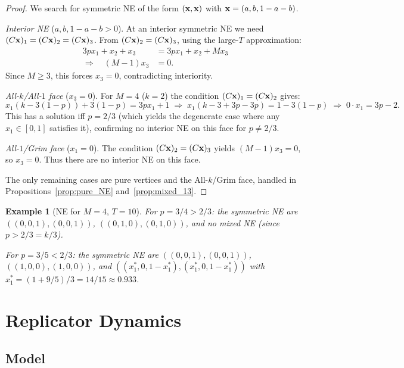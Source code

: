 \documentclass[12pt,a4paper]{article}
\newtheorem{example}{Example}[section]
\begin{document}
\begin{proof}
We search for symmetric NE of the form $({\bf x},{\bf x})$ with
${\bf x}=(a,b,1-a-b)$.

\medskip
\noindent\textit{Interior NE} ($a,b,1-a-b>0$). At an interior symmetric NE
we need $(C{\bf x})_1=(C{\bf x})_2=(C{\bf x})_3$. From $(C{\bf x})_2=(C{\bf x})_3$,
using the large-$T$ approximation:
\begin{align*}
  3px_1+x_2+x_3 &= 3px_1+x_2+Mx_3 \\
  \Rightarrow\quad (M-1)x_3 &= 0.
\end{align*}
Since $M\geq 3$, this forces $x_3=0$, contradicting interiority.

\medskip
\noindent\textit{All-$k$/All-$1$ face} ($x_3=0$). For $M=4$ ($k=2$) the
condition $(C{\bf x})_1=(C{\bf x})_2$ gives:
\[
  x_1(k-3(1-p)) + 3(1-p) = 3px_1 + 1
  \;\Rightarrow\;
  x_1(k-3+3p-3p) = 1-3(1-p)
  \;\Rightarrow\;
  0\cdot x_1 = 3p-2.
\]
This has a solution iff $p=2/3$ (which yields the degenerate case where any
$x_1\in[0,1]$ satisfies it), confirming no interior NE on this face for
$p\neq 2/3$.

\medskip
\noindent\textit{All-$1$/Grim face} ($x_1=0$). The condition $(C{\bf x})_2=(C{\bf x})_3$ yields $(M-1)x_3=0$, so $x_3=0$.
Thus there are no interior NE on this face.

\medskip
The only remaining cases are pure vertices and the All-$k$/Grim face, handled in
Propositions~\ref{prop:pure_NE} and~\ref{prop:mixed_13}.
\end{proof}

\begin{example}[NE for $M=4$, $T=10$]
\label{ex:NE}
For $p=3/4>2/3$: the symmetric NE are
$((0,0,1),(0,0,1))$, $((0,1,0),(0,1,0))$, and no mixed NE (since $p>2/3=k/3$).

For $p=3/5<2/3$: the symmetric NE are
$((0,0,1),(0,0,1))$, $((1,0,0),(1,0,0))$, and
$((x_1^*,0,1-x_1^*),(x_1^*,0,1-x_1^*))$ with $x_1^*=(1+9/5)/3 = 14/15\approx 0.933$.
\end{example}

\section{Replicator Dynamics}
\label{sec:rep}

\subsection{Model}
\end{document}
